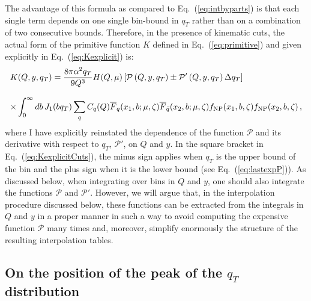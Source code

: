 \documentclass[10pt,a4paper]{article}
\begin{document}
The advantage of this formula as compared to Eq.~(\ref{eq:intbyparts})
is that each single term depends on one single bin-bound in $q_T$
rather than on a combination of two consecutive bounds. Therefore, in
the presence of kinematic cuts, the actual form of the primitive
function $K$ defined in Eq.~(\ref{eq:primitive}) and given explicitly
in Eq.~(\ref{eq:Kexplicit}) is:
\begin{equation}\label{eq:KexplicitCuts}
\begin{array}{l}
 \displaystyle K(Q,y,q_T) =
  \frac{8\pi\alpha^2q_T}{9 Q^3} H(Q,\mu)
  \left[\mathcal{P}\left(Q,y,q_{T}\right) \pm
  \mathcal{P}'\left(Q,y,q_{T}\right)\Delta q_T\right]\\
\\
\displaystyle \times
  \int_0^\infty db\, J_1(bq_T) \sum_q C_q(Q)\overline{F}_q(x_1,b;\mu,\zeta) \overline{F}_{\bar{q}}(x_2,b;\mu,\zeta) f_{\rm NP}(x_1,b,\zeta)
  f_{\rm NP}(x_2,b,\zeta)\,,
\end{array}
\end{equation}
where I have explicitly reinstated the dependence of the function
$\mathcal{P}$ and its derivative with respect to $q_T$,
$\mathcal{P}'$, on $Q$ and $y$. In the square bracket in
Eq.~(\ref{eq:KexplicitCuts}), the minus sign applies when $q_T$ is the
upper bound of the bin and the plus sign when it is the lower bound
(see Eq.~(\ref{eq:lastexpP})). As discussed below, when integrating
over bins in $Q$ and $y$, one should also integrate the functions
$\mathcal{P}$ and $\mathcal{P}'$. However, we will argue that, in the
interpolation procedure discussed below, these functions can be
extracted from the integrals in $Q$ and $y$ in a proper manner in such
a way to avoid computing the expensive function $\mathcal{P}$ many
times and, moreover, simplify enormously the structure of the
resulting interpolation tables.

\subsection{On the position of the peak of the $q_T$ distribution}
\end{document}
